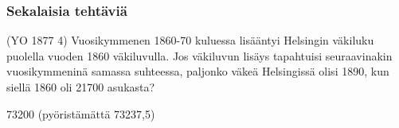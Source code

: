 \subsubsection*{Sekalaisia tehtäviä}

\begin{tehtava}
(YO 1877 4) Vuosikymmenen 1860-70 kuluessa lisääntyi Helsingin väkiluku puolella vuoden 1860 väkiluvulla. Jos väkiluvun lisäys tapahtuisi seuraavinakin vuosikymmeninä samassa suhteessa, paljonko väkeä Helsingissä olisi 1890, kun siellä 1860 oli 21700 asukasta? 
	\begin{vastaus}
	73200 (pyöristämättä 73237,5)
	\end{vastaus}
\end{tehtava}


